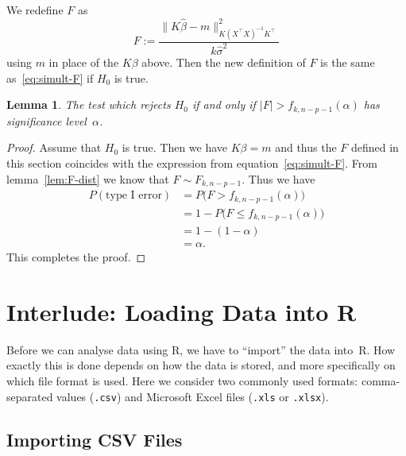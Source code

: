 \documentclass[
  a4paper,
]{article}
\newtheorem{lemma}{Lemma}[section]
\theoremstyle{definition}
\theoremstyle{definition}
\theoremstyle{definition}
\theoremstyle{definition}
\theoremstyle{remark}
\begin{document}
We redefine \(F\) as
\begin{equation*}
  F
  := \frac{\bigl\| K \hat\beta - m \bigr\|_{K(X^\top X)^{-1} K^\top}^2}
          {k \hat\sigma^2}
\end{equation*}
using \(m\) in place of the \(K\beta\) above. Then the new definition of \(F\)
is the same as~\eqref{eq:simult-F} if \(H_0\) is true.

\begin{lemma}
\protect\hypertarget{lem:simult-test}{}\label{lem:simult-test}The test which rejects \(H_0\) if and only if \(|F| > f_{k,n-p-1}(\alpha)\)
has significance level~\(\alpha\).
\end{lemma}

\begin{proof}
Assume that \(H_0\) is true. Then we have \(K\beta = m\) and thus
the \(F\) defined in this section coincides with the expression from
equation~\eqref{eq:simult-F}. From lemma~\ref{lem:F-dist}
we know that \(F \sim F_{k, n-p-1}\). Thus we have
\begin{align*}
  P( \mbox{type I error} )
  &= P\bigl( F > f_{k,n-p-1}(\alpha) \bigr) \\
  &= 1 - P\bigl( F \leq f_{k,n-p-1}(\alpha) \bigr) \\
  &= 1 - (1 - \alpha) \\
  &= \alpha.
\end{align*}
This completes the proof.
\end{proof}

\clearpage

\hypertarget{I02-read.csv}{%
\section*{Interlude: Loading Data into R}\label{I02-read.csv}}

Before we can analyse data using R, we have to ``import'' the data
into~R. How exactly this is done depends on how the data is stored,
and more specifically on which file format is used. Here we consider
two commonly used formats: comma-separated values (\texttt{.csv})
and Microsoft Excel files (\texttt{.xls} or \texttt{.xlsx}).

\hypertarget{importing-csv-files}{%
\subsection*{Importing CSV Files}\label{importing-csv-files}}
\end{document}
